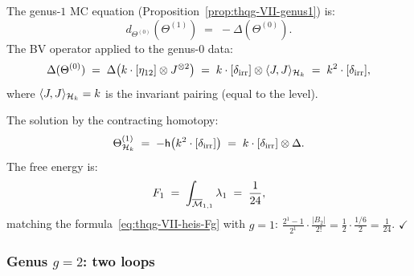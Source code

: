 \begin{computation}
\label{comp:thqg-VII-heis-g1}
The genus-$1$ MC equation
(Proposition~\ref{prop:thqg-VII-genus1}) is:
\begin{equation}\label{eq:thqg-VII-heis-mc-g1}
d_{\Theta^{(0)}}(\Theta^{(1)})
\;=\;
-\Delta(\Theta^{(0)}).
\end{equation}
The BV operator applied to the genus-$0$ data:
\begin{equation}\label{eq:thqg-VII-heis-bv-g0}
\Delta(\Theta^{(0)})
\;=\;
\Delta\bigl(k \cdot [\eta_{12}] \otimes J^{\otimes 2}\bigr)
\;=\;
k \cdot [\delta_{\mathrm{irr}}] \otimes
\langle J, J \rangle_{\mathcal{H}_k}
\;=\;
k^2 \cdot [\delta_{\mathrm{irr}}],
\end{equation}
where $\langle J, J \rangle_{\mathcal{H}_k} = k$ is the invariant
pairing (equal to the level).

The solution by the contracting homotopy:
\begin{equation}\label{eq:thqg-VII-heis-theta1}
\Theta^{(1)}_{\mathcal{H}_k}
\;=\;
-\mathsf{h}\bigl(k^2 \cdot [\delta_{\mathrm{irr}}]\bigr)
\;=\;
k \cdot [\delta_{\mathrm{irr}}] \otimes \Delta.
\end{equation}
The free energy is:
\begin{equation}\label{eq:thqg-VII-heis-F1}
F_1
\;=\;
\int_{\overline{\mathcal{M}}_{1,1}} \lambda_1
\;=\;
\frac{1}{24},
\end{equation}
matching the formula~\eqref{eq:thqg-VII-heis-Fg} with $g = 1$:
$\frac{2^1 - 1}{2^1} \cdot \frac{|B_2|}{2!}
= \frac{1}{2} \cdot \frac{1/6}{2} = \frac{1}{24}$. $\checkmark$
\end{computation}

\subsubsection{Genus $g = 2$: two loops}
\label{subsubsec:thqg-VII-heis-g2}

